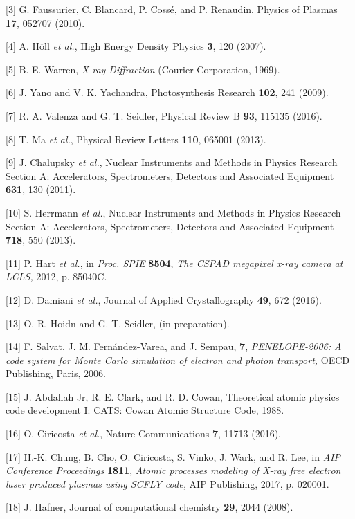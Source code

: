 {[}3{]} G. Faussurier, C. Blancard, P. Cossé, and P. Renaudin, Physics
of Plasmas \textbf{17}, 052707 (2010).

{[}4{]} A. Höll \emph{et al.}, High Energy Density Physics \textbf{3},
120 (2007).

{[}5{]} B. E. Warren, \emph{X-ray Diffraction} (Courier Corporation,
1969).

{[}6{]} J. Yano and V. K. Yachandra, Photosynthesis Research
\textbf{102}, 241 (2009).

{[}7{]} R. A. Valenza and G. T. Seidler, Physical Review B \textbf{93},
115135 (2016).

{[}8{]} T. Ma \emph{et al.}, Physical Review Letters \textbf{110},
065001 (2013).

{[}9{]} J. Chalupsky \emph{et al.}, Nuclear Instruments and Methods in
Physics Research Section A: Accelerators, Spectrometers, Detectors and
Associated Equipment \textbf{631}, 130 (2011).

{[}10{]} S. Herrmann \emph{et al.}, Nuclear Instruments and Methods in
Physics Research Section A: Accelerators, Spectrometers, Detectors and
Associated Equipment \textbf{718}, 550 (2013).

{[}11{]} P. Hart \emph{et al.}, in \emph{Proc. SPIE} \textbf{8504},
\emph{The CSPAD megapixel x-ray camera at LCLS,} 2012, p. 85040C.

{[}12{]} D. Damiani \emph{et al.}, Journal of Applied Crystallography
\textbf{49}, 672 (2016).

{[}13{]} O. R. Hoidn and G. T. Seidler, (in preparation).

{[}14{]} F. Salvat, J. M. Fernández-Varea, and J. Sempau, \textbf{7},
\emph{PENELOPE-2006: A code system for Monte Carlo simulation of
electron and photon transport,} OECD Publishing, Paris, 2006.

{[}15{]} J. Abdallah Jr, R. E. Clark, and R. D. Cowan, Theoretical
atomic physics code development I: CATS: Cowan Atomic Structure Code,
1988.

{[}16{]} O. Ciricosta \emph{et al.}, Nature Communications \textbf{7},
11713 (2016).

{[}17{]} H.-K. Chung, B. Cho, O. Ciricosta, S. Vinko, J. Wark, and R.
Lee, in \emph{AIP Conference Proceedings} \textbf{1811}, \emph{Atomic
processes modeling of X-ray free electron laser produced plasmas using
SCFLY code,} AIP Publishing, 2017, p. 020001.

{[}18{]} J. Hafner, Journal of computational chemistry \textbf{29}, 2044
(2008).

